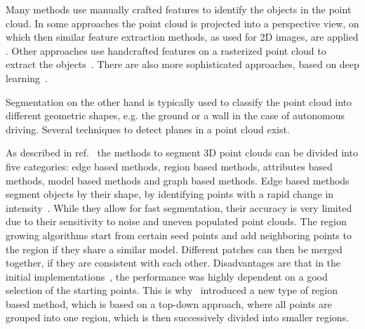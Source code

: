 Many methods use manually crafted features to identify the objects in the point cloud.
In some approaches the point cloud is projected into a perspective view, on which then similar feature extraction methods, as used for 2D images, are applied
\cite{Premebida2014, Li2016}.
Other approaches use handcrafted features on a rasterized point cloud to extract the objects~\cite{Song2014, Song2016}.
There are also more sophisticated approaches, based on deep learning~\cite{Qi2017, Qi2017b, Zhuo2018}.

Segmentation on the other hand is typically used to classify the point cloud into different geometric shapes, e.g. the ground or a wall in the case of autonomous driving.
Several techniques to detect planes in a point cloud exist.

As described in ref.~\cite{Nguyen2013} the methods to segment 3D point clouds can be divided into five categories: edge based methods, region based methods, attributes based methods, model based methods and graph based methods.
Edge based methods segment objects by their shape, by identifying points with a rapid change in intensity~\cite{Sappa2001}. While they allow for fast segmentation, their accuracy is very limited due to their sensitivity to noise and uneven populated point clouds.
The region growing algorithms start from certain seed points and add neighboring points to the region if they share a similar model.
Different patches can then be merged together, if they are consistent with each other.
Disadvantages are that in the initial implementations~\cite{Besl1988, Taubin1991}, the performance was highly dependent on a good selection of the starting points.
This is why~\cite{Chen2008} introduced a new type of region based method, which is based on a top-down approach, where all points are grouped into one region, which is then successively divided into smaller regions.

